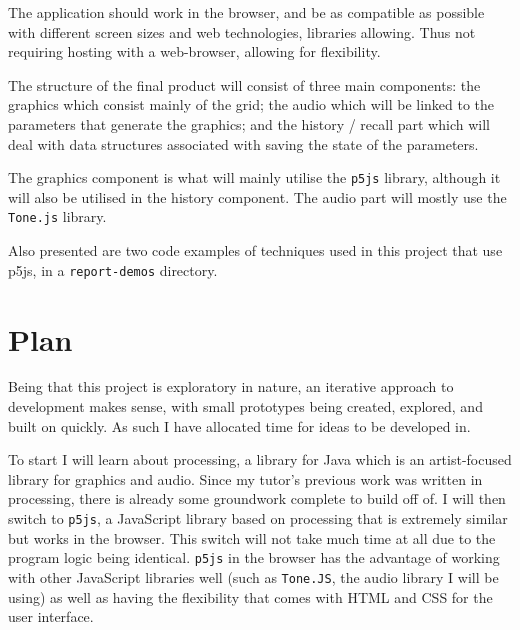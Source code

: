 The application should work in the browser, and be as compatible as possible
with different screen sizes and web technologies, libraries allowing. Thus not
requiring hosting with a web-browser, allowing for flexibility.

The structure of the final product will consist of three main components: the
graphics which consist mainly of the grid; the audio which will be linked to the
parameters that generate the graphics; and the history / recall part which will
deal with data structures associated with saving the state of the parameters.

The graphics component is what will mainly utilise the \verb|p5js| library,
although it will also be utilised in the history component. The audio part will
mostly use the \verb|Tone.js| library.

Also presented are two code examples of techniques used in this project that use
p5js, in a \verb|report-demos| directory.

\section{Plan}
Being that this project is exploratory in nature, an iterative approach to
development makes sense, with small prototypes being created, explored, and
built on quickly. As such I have allocated time for ideas to be developed in.

To start I will learn about processing, a library for Java which is an
artist-focused library for graphics and audio. Since my tutor's previous work
was written in processing, there is already some groundwork complete to build
off of. I will then switch to \verb|p5js|, a JavaScript library based on
processing that is extremely similar but works in the browser. This switch will
not take much time at all due to the program logic being identical. \verb|p5js|
in the browser has the advantage of working with other JavaScript libraries well
(such as \verb|Tone.JS|, the audio library I will be using) as well as having
the flexibility that comes with HTML and CSS for the user interface.

